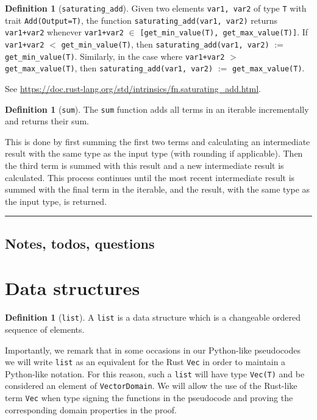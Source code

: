 \documentclass[11pt,a4paper]{article}
\theoremstyle{definition}
\newtheorem{definition}[theorem]{Definition}
\newcommand{\horizline}{\noindent\rule{\textwidth}{1pt}}
\newcommand{\inRust}[2]{See \url{#2}.}
\begin{document}
\begin{definition}[\texttt{saturating\_add}]
    \label{defn:fn-saturating-add}
    Given two elements \texttt{var1, var2} of type \texttt{T} with trait \texttt{Add(Output=T)}, the function  \texttt{saturating\_add(var1, var2)} returns \texttt{var1+var2} whenever \texttt{var1+var2} $\in$ \texttt{[get\_min\_value(T), get\_max\_value(T)]}. If \texttt{var1+var2} $<$ \texttt{get\_min\_value(T)}, then \texttt{saturating\_add(var1, var2)} $:=$ \texttt{get\_min\_value(T)}. Similarly, in the case where \texttt{var1+var2} $>$ \texttt{get\_max\_value(T)}, then \texttt{saturating\_add(var1, var2)} $:=$ \texttt{get\_max\_value(T)}. 
    
    \inRust{std::intrinsics::saturating\_add}{https://doc.rust-lang.org/std/intrinsics/fn.saturating_add.html}
\end{definition}

\begin{definition}[\texttt{sum}]
    The \texttt{sum} function adds all terms in an iterable incrementally and returns their sum.
    
    This is done by first summing the first two terms and calculating an intermediate result with the same type as the input type (with rounding if applicable). Then the third term is summed with this result and a new intermediate result is calculated. This process continues until the most recent intermediate result is summed with the final term in the iterable, and the result, with the same type as the input type, is returned.
\end{definition}

\horizline

\subsection{Notes, todos, questions}

\section{Data structures}

\begin{definition}[\texttt{list}]
    A \texttt{list} is a data structure which is a changeable ordered sequence of elements.
\end{definition}

Importantly, we remark that in some occasions in our Python-like pseudocodes we will write \texttt{list} as an equivalent for the Rust \texttt{Vec} in order to maintain a Python-like notation. For this reason, such a \texttt{list} will have type \texttt{Vec(T)} and be considered an element of \texttt{VectorDomain}. We will allow the use of the Rust-like term \texttt{Vec} when type signing the functions in the pseudocode and proving the corresponding domain properties in the proof.
\end{document}
